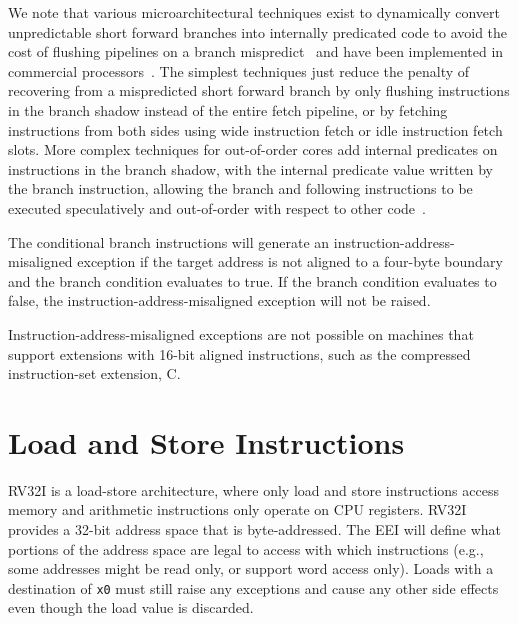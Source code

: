 \begin{commentary}
We note that various microarchitectural techniques exist to
dynamically convert unpredictable short forward branches into
internally predicated code to avoid the cost of flushing pipelines on
a branch mispredict~\cite{heil-tr1996,Klauser-1998,Kim-micro2005} and
have been implemented in commercial processors~\cite{ibmpower7}.
The simplest techniques just reduce the penalty of recovering from a
mispredicted short forward branch by only flushing instructions in the
branch shadow instead of the entire fetch pipeline, or by fetching
instructions from both sides using wide instruction fetch or idle
instruction fetch slots.  More complex techniques for out-of-order
cores add internal predicates on instructions in the branch shadow,
with the internal predicate value written by the branch instruction,
allowing the branch and following instructions to be executed
speculatively and out-of-order with respect to other code~\cite{ibmpower7}.
\end{commentary}

The conditional branch instructions will generate an
instruction-address-misaligned exception if the target address is not
aligned to a four-byte boundary and the branch condition evaluates
to true.  If the branch condition evaluates to false, the
instruction-address-misaligned exception will not be raised.

\begin{commentary}
Instruction-address-misaligned exceptions are not possible on machines
that support extensions with 16-bit aligned instructions, such as the
compressed instruction-set extension, C.
\end{commentary}

\section{Load and Store Instructions}
\label{sec:rv32:ldst}

RV32I is a load-store architecture, where only load and store
instructions access memory and arithmetic instructions only operate on
CPU registers.  RV32I provides a 32-bit address space that is
byte-addressed.
The EEI will define what portions of the address space are legal to access with
which instructions (e.g., some addresses might be read only, or
support word access only).  Loads with a destination of {\tt x0} must
still raise any exceptions and cause any other side effects even
though the load value is discarded.

